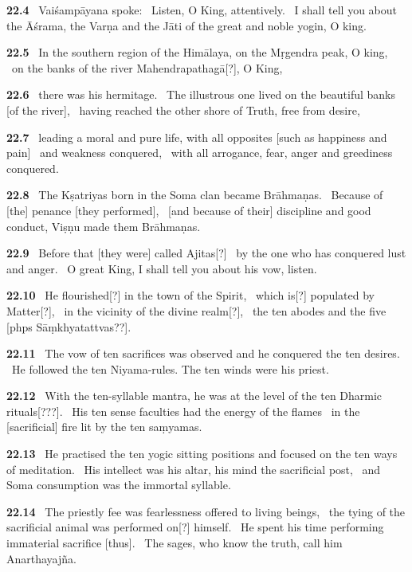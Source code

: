 \documentclass{article}
\begin{document}
\textbf{22.4}%
\ Vaiśampāyana spoke:%
\ Listen, O King, attentively.%
\ I shall tell you about the Āśrama, the Varṇa and the Jāti of the great and noble yogin, O king.%


\textbf{22.5}%
\ In the southern region of the Himālaya, on the Mṛgendra peak, O king,%
\ on the banks of the river Mahendrapathagā[?], O King,%


\textbf{22.6}%
\ there was his hermitage.%
\ The illustrous one lived on the beautiful banks [of the river],%
\              having reached the other shore of Truth, free from desire,%


\textbf{22.7}%
\ leading a moral and pure life, with all opposites [such as happiness and pain]%
\                                 and weakness conquered,%
\ with all arrogance, fear, anger and greediness conquered.%


\textbf{22.8}%
\ The Kṣatriyas born in the Soma clan became Brāhmaṇas.%
\ Because of [the] penance [they performed],%
\              [and because of their] discipline and good conduct, Viṣṇu made them Brāhmaṇas.%


\textbf{22.9}%
\ Before that [they were] called Ajitas[?]%
\      by the one who has conquered lust and anger.%
\ O great King, I shall tell you about his vow, listen.%


\textbf{22.10}%
\ He flourished[?] in the town of the Spirit,%
\              which is[?] populated by Matter[?],%
\ in the vicinity of the divine realm[?],%
\              the ten abodes and the five [phps Sāṃkhyatattvas??].%


\textbf{22.11}%
\ The vow of ten sacrifices was observed and he conquered the ten desires.%
\ He followed the ten Niyama-rules. The ten winds were his priest.%


\textbf{22.12}%
\ With the ten-syllable mantra, he was at the level of the ten Dharmic rituals[???].%
\ His ten sense faculties had the energy of the flames%
\                         in the [sacrificial] fire lit by the ten saṃyamas.%


\textbf{22.13}%
\ He practised the ten yogic sitting positions and focused on the ten ways of meditation.%
\ His intellect was his altar, his mind the sacrificial post,%
\                         and Soma consumption was the immortal syllable.%


\textbf{22.14}%
\ The priestly fee was fearlessness offered to living beings,%
\                      the tying of the sacrificial animal was performed on[?] himself.%
\ He spent his time performing immaterial sacrifice [thus].%
\ The sages, who know the truth, call him Anarthayajña.%
\end{document}
